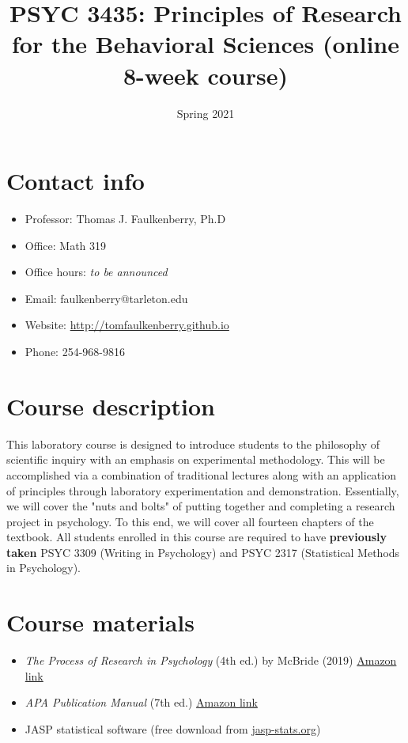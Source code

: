 \documentclass[10pt]{article}
\date{Spring 2021}
\title{PSYC 3435: Principles of Research for the Behavioral Sciences (online 8-week course)}
\begin{document}
\maketitle

\section*{Contact info}
\label{sec:org1c045f3}
\begin{itemize}
\item Professor: Thomas J. Faulkenberry, Ph.D
\item Office: Math 319
\item Office hours: \emph{to be announced}
\item Email: faulkenberry@tarleton.edu
\item Website: \url{http://tomfaulkenberry.github.io}
\item Phone: 254-968-9816
\end{itemize}

\section*{Course description}
\label{sec:orge3be3f1}

This laboratory course is designed to introduce students to the philosophy of scientific inquiry with an emphasis on experimental methodology. This will be accomplished via a combination of traditional lectures along with an application of principles through laboratory experimentation and demonstration. Essentially, we will cover the "nuts and bolts" of putting together and completing a research project in psychology. To this end, we will cover all fourteen chapters of the textbook. All students enrolled in this course are required to have \textbf{previously taken} PSYC 3309 (Writing in Psychology) and PSYC 2317 (Statistical Methods in Psychology). 

\section*{Course materials}
\label{sec:org4c2de3d}

\begin{itemize}
\item \emph{The Process of Research in Psychology} (4th ed.) by McBride (2019) \href{https://www.amazon.com/Process-Research-Psychology-Dawn-McBride/dp/1544323492}{Amazon link}
\item \emph{APA Publication Manual} (7th ed.) \href{https://www.amazon.com/Publication-Manual-American-Psychological-Association/dp/143383216X}{Amazon link}
\item JASP statistical software (free download from \href{http://jasp-stats.org}{jasp-stats.org})
\end{itemize}
\end{document}
